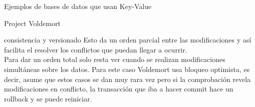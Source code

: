 \begin{section}{Ejemplos de bases de datos que usan Key-Value}
\begin{subsection}{Project Voldemort}
\begin{subsubsection}{consistencia y versionado}
Esto da un orden parcial entre las modificaciones y así facilita el resolver los conflictos que puedan llegar a ocurrir.\\

Para dar un orden total solo resta ver cuando se realizan modificaciones simultáneas sobre los datos. Para este caso Voldemort usa bloqueo optimista, es decir, asume que estos casos se dan muy rara vez pero si la comprobación revela modificaciones en conflicto, la transacción que iba a hacer commit hace un rollback y se puede reiniciar.\\

\end{subsubsection}

\end{subsection}

\end{section}
